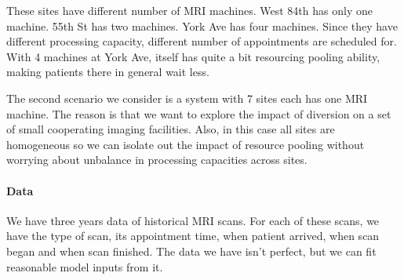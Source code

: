 These sites have different number of MRI machines. West 84th has
only one machine. 55th St has two machines. York Ave has four machines.
Since they have different processing capacity, different number of
appointments are scheduled for. With 4 machines
at York Ave, itself has quite a bit resourcing pooling ability, making
patients there in general wait less.

The second scenario we consider is a system with 7 sites each has one
MRI machine. The reason is that we want to explore the impact of
diversion on a set of small cooperating imaging facilities. Also,
in this case all sites are homogeneous so we can isolate out
the impact of resource pooling without worrying about unbalance in
processing capacities across sites.

\paragraph{Data}
We have three years data of historical MRI scans. For each of these
scans, we have the type of scan, its appointment time, when patient
arrived, when scan began and when scan finished. The data we have
isn't perfect, but we can fit reasonable model inputs from it.

